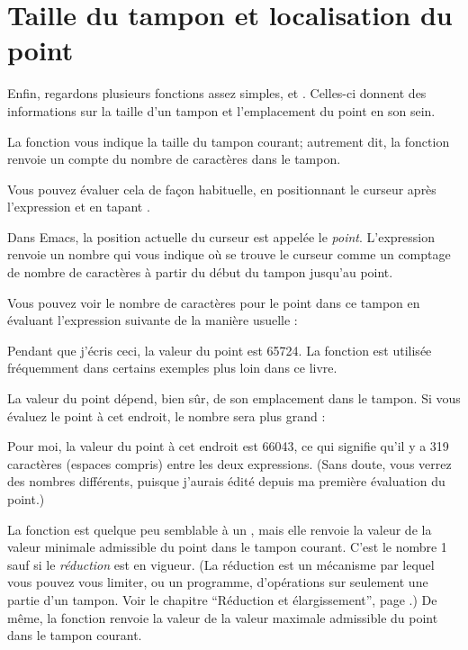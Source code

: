 \section{Taille du tampon et localisation du point}

Enfin, regardons plusieurs fonctions assez simples,  et . Celles-ci donnent des informations sur
la taille d'un tampon et l'emplacement du point en son sein.

La fonction  vous indique la taille du tampon courant;
autrement dit, la fonction renvoie un compte du nombre de caractères
dans le tampon.


Vous pouvez évaluer cela de façon habituelle, en positionnant le
curseur après l'expression et en tapant .

Dans Emacs, la position actuelle du curseur est appelée le
\textit{point}. L'expression  renvoie un nombre qui vous
indique où se trouve le curseur comme un comptage de nombre de
caractères à partir du début du tampon jusqu'au point.

Vous pouvez voir le nombre de caractères pour le point dans ce tampon
en évaluant l'expression suivante de la manière usuelle :


Pendant que j'écris ceci, la valeur du point est 65724. La fonction
 est utilisée fréquemment dans certains exemples plus loin
dans ce livre. 

La valeur du point dépend, bien sûr, de son emplacement dans le
tampon. Si vous évaluez le point à cet endroit, le nombre sera plus
grand :


Pour moi, la valeur du point à cet endroit est 66043, ce qui signifie
qu'il y a 319 caractères (espaces compris) entre les deux
expressions. (Sans doute, vous verrez des nombres différents, puisque
j'aurais édité depuis ma première évaluation du point.)

La fonction  est quelque peu semblable à un , mais
elle renvoie la valeur de la valeur minimale admissible du point dans
le tampon courant. C'est le nombre 1 sauf si le \textit{réduction} est
en vigueur. (La réduction est un mécanisme par lequel vous pouvez vous
limiter, ou un programme, d'opérations sur seulement une partie d'un
tampon. Voir le chapitre  ``Réduction et élargissement'', page
.) De même, la fonction  renvoie la valeur de
la valeur maximale admissible du point dans le tampon courant.
